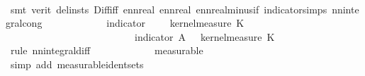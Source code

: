 \begin{isabellebody}
\ \ \ \ \ \ \ \ \isamarkupfalse%
\ {\isacharparenleft}{\kern0pt}smt\ {\isacharparenleft}{\kern0pt}verit{\isacharcomma}{\kern0pt}\ del{\isacharunderscore}{\kern0pt}insts{\isacharparenright}{\kern0pt}\ Diff{\isacharunderscore}{\kern0pt}iff\ ennreal{\isacharunderscore}{\kern0pt}{}\ ennreal{\isacharunderscore}{\kern0pt}{}\ ennreal{\isacharunderscore}{\kern0pt}minus{\isacharunderscore}{\kern0pt}if\ indicator{\isacharunderscore}{\kern0pt}simps\ nn{\isacharunderscore}{\kern0pt}integral{\isacharunderscore}{\kern0pt}cong{\isacharparenright}{\kern0pt}\isanewline
\ \ \ \ \ \ \isamarkupfalse%
\ \isamarkupfalse%
\ {\isachardoublequoteopen}{\isachardot}{\kern0pt}{\isachardot}{\kern0pt}{\isachardot}{\kern0pt}\ {\isacharequal}{\kern0pt}\ {\isacharparenleft}{\kern0pt}{\isasymintegral}\isactrlsup {\isacharplus}{\kern0pt}{\isasymomega}\ indicator\ {\isacharparenleft}{\kern0pt}{\isacharquery}{\kern0pt}{\isasymOmega}\ {\isasymtimes}\ {\isacharquery}{\kern0pt}{\isasymOmega}\ {\isasymomega}\ {\isasympartial}kernel{\isacharunderscore}{\kern0pt}measure\ K\ {\isasymomega}\ \isanewline
\ \ \ \ \ \ \ \ \ \ \ \ \ \ \ \ \ \ \ \ \ \ \ \ {\isacharminus}{\kern0pt}\ {\isacharparenleft}{\kern0pt}{\isasymintegral}\isactrlsup {\isacharplus}{\kern0pt}{\isasymomega}\ indicator\ A\ {\isacharparenleft}{\kern0pt}{\isasymomega}\ {\isasymomega}\ {\isasympartial}kernel{\isacharunderscore}{\kern0pt}measure\ K\ {\isasymomega}\isanewline
\ \ \ \ \ \ \ \ \isamarkupfalse%
\ {\isacharparenleft}{\kern0pt}rule\ nn{\isacharunderscore}{\kern0pt}integral{\isacharunderscore}{\kern0pt}diff{\isacharparenright}{\kern0pt}\isanewline
\ \ \ \ \ \ \ \ \isamarkupfalse%
\ {\isasymomega}\ \isamarkupfalse%
\ measurable\isanewline
\ \ \ \ \ \ \ \ \ \ \ \isamarkupfalse%
\ {\isacharparenleft}{\kern0pt}simp\ add{\isacharcolon}{\kern0pt}\ measurable{\isacharunderscore}{\kern0pt}ident{\isacharunderscore}{\kern0pt}sets{\isacharparenright}{\kern0pt}\isanewline

\end{isabellebody}

